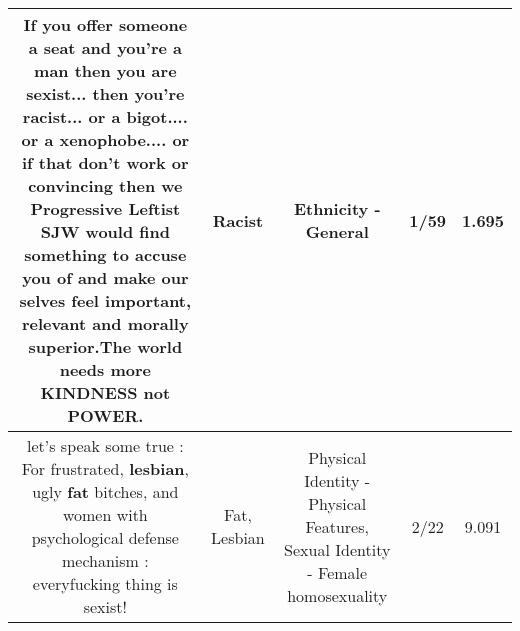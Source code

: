 \documentclass[11pt]{article}
\newlength\mylength
\begin{document}
\begin{center}
\begin{longtable}{|C{.65\mylength}|C{.30\mylength}|C{.12\mylength}|C{.12\mylength}|C{.12\mylength}|}
  \small If you offer someone a seat and you're a man then you are sexist... then you're \textbf{racist}... or a bigot.... or a xenophobe.... or if that don't work or convincing then we Progressive Leftist SJW would find something to accuse you of and make our selves feel important, relevant and morally superior.The world needs more KINDNESS not POWER.\normalsize   & Racist & Ethnicity - General & 1/59 & 1.695 \\  \hline
  \small let's speak some true : For frustrated, \textbf{lesbian}, ugly \textbf{fat} bitches, and women with psychological defense mechanism : everyfucking thing is sexist!\normalsize   & Fat, Lesbian & Physical Identity - Physical Features, Sexual Identity - Female homosexuality & 2/22 & 9.091 \\  \hline

\end{longtable}
\end{center}
\end{document}
